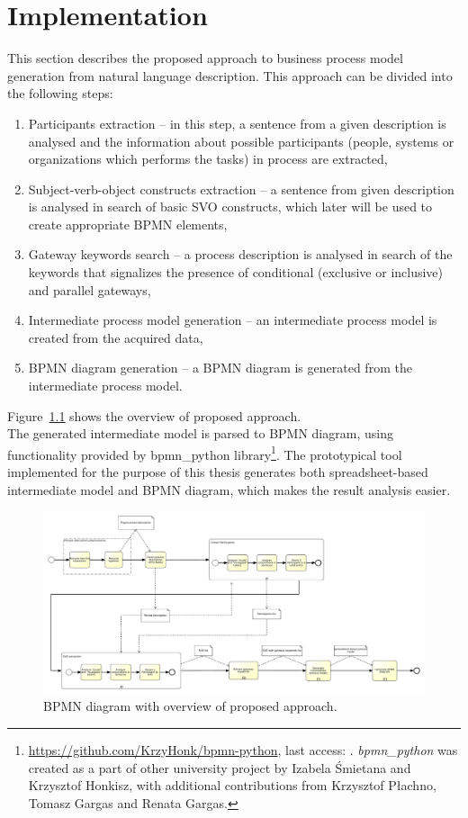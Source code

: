 \chapter{Implementation}
\label{cha:implementation}
This section describes the proposed approach to business process model generation from natural language description. This approach can be divided into the following steps:
\begin{enumerate}
	\item Participants extraction -- in this step, a sentence from a given description is analysed and the information about possible participants (people, systems or organizations which performs the tasks) in process are extracted,
	\item Subject-verb-object constructs extraction -- a sentence from given description is analysed in search of basic SVO constructs, which later will be used to create appropriate BPMN elements,
	\item Gateway keywords search -- a process description is analysed in search of the keywords that signalizes the presence of conditional (exclusive or inclusive) and parallel gateways,
	\item Intermediate process model generation -- an intermediate process model is created from the acquired data,
	\item BPMN diagram generation -- a BPMN diagram is generated from the intermediate process model.
\end{enumerate}
Figure~\ref{fig:method_overview} shows the overview of proposed approach.\\
The generated intermediate model is parsed to BPMN diagram, using functionality provided by bpmn\_python library\footnote{\url{https://github.com/KrzyHonk/bpmn-python}, last access: \onlineAccess. \emph{bpmn\_python} was created as a part of other university project by Izabela Śmietana and Krzysztof Honkisz, with additional contributions from Krzysztof Płachno, Tomasz Gargas and Renata Gargas.}. The prototypical tool implemented for the purpose of this thesis generates both spreadsheet-based intermediate model and BPMN diagram, which makes the result analysis easier.
\begin{figure}[H]
	\centering
	\includegraphics[width=0.95\textheight, angle=90]{./images/method_overview.pdf}
	\caption{BPMN diagram with overview of proposed approach.}
	\label{fig:method_overview}
\end{figure}

